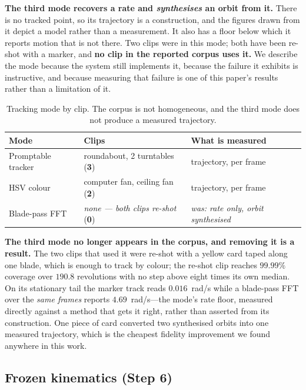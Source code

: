 \documentclass[conference]{IEEEtran}
\begin{document}
\textbf{The third mode recovers a rate and \emph{synthesises} an orbit from
it.} There is no tracked point, so its trajectory is a construction, and the
figures drawn from it depict a model rather than a measurement. It also has a
floor below which it reports motion that is not there. Two clips were in this
mode; both have been re-shot with a marker, and \textbf{no clip in the reported
corpus uses it.} We describe the mode because the system still implements it,
because the failure it exhibits is instructive, and because measuring that
failure is one of this paper's results rather than a limitation of it.

\label{sec:tracking}
\begin{table}[t]
\caption{Tracking mode by clip. The corpus is not homogeneous, and the third
mode does not produce a measured trajectory.}
\label{tab:modes}
\centering
\footnotesize
\begin{tabular}{@{}p{}p{}p{}@{}}
\toprule
\textbf{Mode} & \textbf{Clips} & \textbf{What is measured} \\
\midrule
Promptable tracker & roundabout, 2 turntables (\textbf{3}) & trajectory, per frame \\
\addlinespace[2pt]
HSV colour & computer fan, ceiling fan (\textbf{2}) & trajectory, per frame \\
\addlinespace[2pt]
Blade-pass FFT & \emph{none --- both clips re-shot} (\textbf{0}) & \emph{was: rate only, orbit synthesised} \\
\bottomrule
\end{tabular}
\end{table}

\textbf{The third mode no longer appears in the corpus, and removing it is a
result.} The two clips that used it were re-shot with a yellow card taped along
one blade, which is enough to track by colour; the re-shot clip reaches
$99.99\%$ coverage over $190.8$ revolutions with no step above eight times its
own median. On its stationary tail the marker track reads $0.016$~rad/s while a
blade-pass FFT over the \emph{same frames} reports $4.69$~rad/s---the mode's
rate floor, measured directly against a method that gets it right, rather than
asserted from its construction. One piece of card converted two synthesised
orbits into one measured trajectory, which is the cheapest fidelity improvement
we found anywhere in this work.

\subsection{Frozen kinematics (Step 6)}
\end{document}
